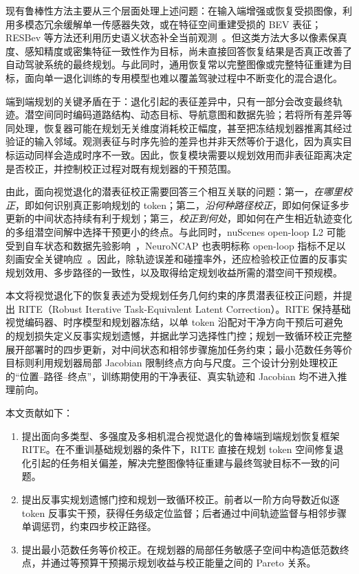 \documentclass[letterpaper,10pt,conference]{ieeeconf}
\begin{document}
现有鲁棒性方法主要从三个层面处理上述问题：在输入端增强或恢复受损图像，利用多模态冗余缓解单一传感器失效，或在特征空间重建受损的 BEV 表征；RESBev 等方法还利用历史语义状态补全当前观测~\cite{zhuo2026resbev}。但这类方法大多以像素保真度、感知精度或密集特征一致性作为目标，尚未直接回答恢复结果是否真正改善了自动驾驶系统的最终规划。与此同时，通用恢复常以完整图像或完整特征重建为目标，面向单一退化训练的专用模型也难以覆盖驾驶过程中不断变化的混合退化。

端到端规划的关键矛盾在于：退化引起的表征差异中，只有一部分会改变最终轨迹。潜空间同时编码道路结构、动态目标、导航意图和数据先验；若将所有差异等同处理，恢复器可能在规划无关维度消耗校正幅度，甚至把冻结规划器推离其经过验证的输入邻域。观测表征与时序先验的差异也并非天然等价于退化，因为真实目标运动同样会造成时序不一致。因此，恢复模块需要以规划效用而非表征距离决定是否校正，并控制校正过程对既有规划器的干预范围。

由此，面向视觉退化的潜表征校正需要回答三个相互关联的问题：第一，\emph{在哪里校正}，即如何识别真正影响规划的 token；第二，\emph{沿何种路径校正}，即如何保证多步更新的中间状态持续有利于规划；第三，\emph{校正到何处}，即如何在产生相近轨迹变化的多组潜空间解中选择干预更小的终点。与此同时，nuScenes open-loop L2 可能受到自车状态和数据先验影响~\cite{li2024egostatus,zhai2023rethinking}，NeuroNCAP 也表明标称 open-loop 指标不足以刻画安全关键响应~\cite{ljungbergh2024neuroncap}。因此，除轨迹误差和碰撞率外，还应检验校正位置的反事实规划效用、多步路径的一致性，以及取得给定规划收益所需的潜空间干预规模。

本文将视觉退化下的恢复表述为受规划任务几何约束的序贯潜表征校正问题，并提出 RITE（Robust Iterative Task-Equivalent Latent Correction）。RITE 保持基础视觉编码器、时序模型和规划器冻结，以单 token 沿配对干净方向干预后可避免的规划损失定义反事实规划遗憾，并据此学习选择性门控；规划一致循环校正完整展开部署时的四步更新，对中间状态和相邻步骤施加任务约束；最小范数任务等价目标则利用规划器局部 Jacobian 限制终点方向与尺度。三个设计分别处理校正的“位置--路径--终点”，训练期使用的干净表征、真实轨迹和 Jacobian 均不进入推理前向。

本文贡献如下：
\begin{enumerate}
  \item 提出面向多类型、多强度及多相机混合视觉退化的鲁棒端到端规划恢复框架 RITE。在不重训基础规划器的条件下，RITE 直接在规划 token 空间修复退化引起的任务相关偏差，解决完整图像特征重建与最终驾驶目标不一致的问题。
  \item 提出反事实规划遗憾门控和规划一致循环校正。前者以一阶方向导数近似逐 token 反事实干预，获得任务级定位监督；后者通过中间轨迹监督与相邻步骤单调惩罚，约束四步校正路径。
  \item 提出最小范数任务等价校正。在规划器的局部任务敏感子空间中构造低范数终点，并通过等预算干预揭示规划收益与校正能量之间的 Pareto 关系。
\end{enumerate}
\end{document}
